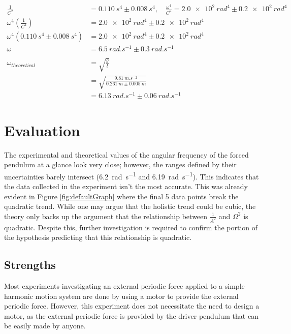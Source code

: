\documentclass[letterpaper, 12pt]{article}
\begin{document}
\begin{align*}
    \frac{1}{C^2}                                  & = \SI{0.110}{s^4} \pm \SI{0.008}{s^4},\quad \frac{\omega^4}{C^2} = \SI{2.0e2}{rad^4} \pm \SI{0.2e2}{rad^4}
    \\
    \omega^4 \left( \frac{1}{C^2} \right)          & = \SI{2.0e2}{rad^4} \pm \SI{0.2e2}{rad^4}
    \\
    \omega^4 (\SI{0.110}{s^4} \pm \SI{0.008}{s^4}) & = \SI{2.0e2}{rad^4} \pm \SI{0.2e2}{rad^4}
    \\
    \omega                                         & = \SI{6.5}{rad.s^{-1}} \pm \SI{0.3}{rad.s^{-1}}
    \\
    \\
    \omega_{theoretical}                           & = \sqrt{\frac{g}{l}}
    \\
                                                   & = \sqrt{\frac{\SI{9.81}{m.s^{-2}}}{\SI{0.261}{m} \pm \SI{0.005}{m}}}
    \\
                                                   & = \SI{6.13}{rad.s^{-1}} \pm \SI{0.06}{rad.s^{-1}}
\end{align*}

\section{Evaluation}

The experimental and theoretical values of the
angular frequency of the forced pendulum at a glance
look very close; however, the ranges defined by their
uncertainties barely intersect (\SI{6.2}{rad.s^{-1}} and \SI{6.19}{rad.s^{-1}}). This indicates that
the data collected in the experiment isn't the most accurate.
This was already evident in Figure \ref*{fig:defaultGraph} where
the final 5 data points break the quadratic trend.
While one may argue that the holistic trend
could be cubic, the theory only backs up the argument
that the relationship between \(\frac{1}{A^2}\) and \(\Omega^2\)
is quadratic. Despite this, further investigation
is required to confirm the portion of the hypothesis
predicting that this relationship is quadratic.

\subsection{Strengths}

Most experiments investigating an external periodic
force applied to a simple harmonic motion system
are done by using a motor to provide the external
periodic force. However, this experiment does
not necessitate the need to design a motor, as
the external periodic force is provided by
the driver pendulum that can be easily
made by anyone.
\end{document}
